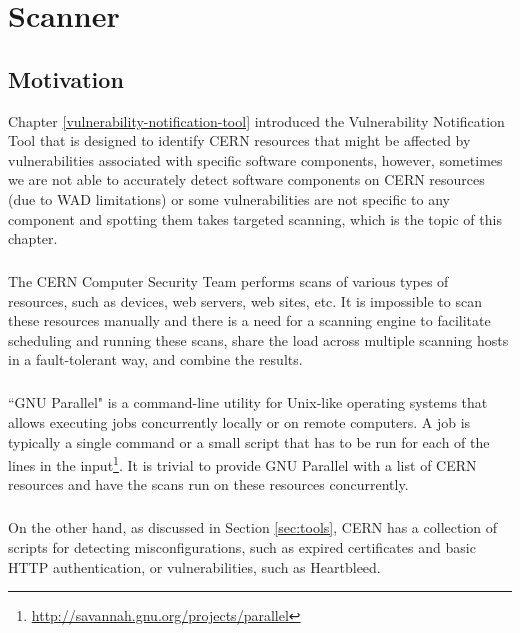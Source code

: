 \chapter{Scanner}
\label{scanner}
\thispagestyle{empty}

\section{Motivation}
\label{scanner_motivation}
Chapter \ref{vulnerability-notification-tool} introduced the Vulnerability Notification Tool that is designed to identify CERN resources that might be affected by vulnerabilities associated with specific software components, however, sometimes we are not able to accurately detect software components on CERN resources (due to WAD limitations) or some vulnerabilities are not specific to any component and spotting them takes targeted scanning, which is the topic of this chapter. 
\paragraph{}
The CERN Computer Security Team performs scans of various types of resources, such as devices, web servers, web sites, etc. It is impossible to scan these resources manually and there is a need for a scanning engine to facilitate scheduling and running these scans, share the load across multiple scanning hosts in a fault-tolerant way, and combine the results.
\paragraph{}
``GNU Parallel" is a command-line utility for Unix-like operating systems that allows executing jobs concurrently locally or on remote computers. A job is typically a single command or a small script that has to be run for each of the lines in the input\footnote{\url{http://savannah.gnu.org/projects/parallel}}. It is trivial to provide GNU Parallel with a list of CERN resources and have the scans run on these resources concurrently.
\paragraph{}
On the other hand, as discussed in Section \ref{sec:tools}, CERN has a collection of scripts for detecting misconfigurations, such as expired certificates and basic HTTP authentication, or vulnerabilities, such as Heartbleed. 
